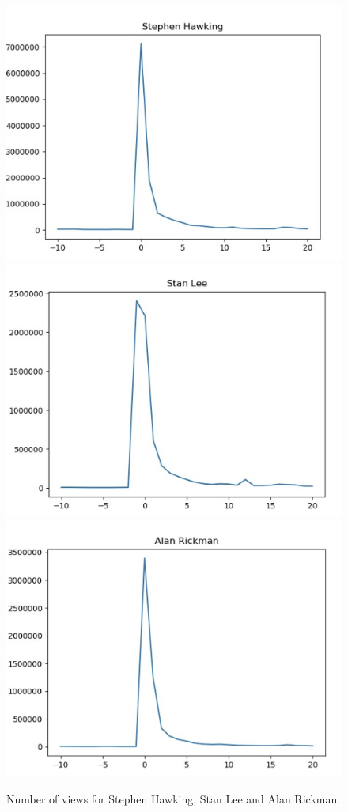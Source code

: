 \documentclass[conference]{IEEEtran}
\begin{document}
\begin{figure}[!htb]
  \includegraphics[width=\linewidth]{viewsSH.png}
\endminipage\hfill
{}
  \includegraphics[width=\linewidth]{viewsSL.png}
\endminipage\hfill
{}%
  \includegraphics[width=\linewidth]{viewsAR.png}
\endminipage
\caption{Number of views for Stephen Hawking, Stan Lee and Alan Rickman.}
\end{figure}
\end{document}
